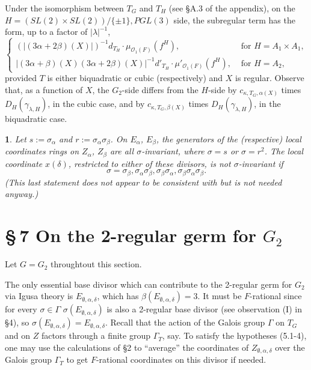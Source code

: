 \documentclass[12pt,letterpaper]{amsart}
\newcommand{\proclaimname}{}
\newtheorem*{proclaimx}{\proclaimname}
\newenvironment{proclaim}[1]%
  {\renewcommand{\proclaimname}{#1}\begin{proclaimx}}{\end{proclaimx}}
\begin{document}
Under the isomorphism between $T_G$ and $T_H$ (see \S A.3 of the appendix),
on the $H=(SL(2)\times SL(2))/\{\pm 1\},PGL(3)$ side,
the subregular term has the form, up to a factor of $|\lambda|^{-1}$,
\[
\begin{cases}
(|(3\alpha+2\beta)(X)|)^{-1}d_{T_H}\cdot
\mu_{{\mathcal O}_1(F)}(f^H),&\text{ for }
H=A_1\times A_1,\\
|(3\alpha+\beta)(X)(3\alpha+2\beta)(X)|^{-1}d'_{T_H}
\cdot \mu'_{{\mathcal O}_1(F)}(f^H),&\text{ for }H=A_2,
\end{cases}
\tag{6.8}
\]
provided $T$ is either biquadratic or cubic (respectively) and
$X$ is regular.
Observe that, as a function of $X$, the $G_2$-side differs
from the $H$-side by $c_{\kappa, T_G,\alpha(X)}$ times
$D_H(\gamma_{\lambda,H})$,
in the cubic case, and by $c_{\kappa, T_G,\beta(X)}$
times $D_H(\gamma_{\lambda,H})$,
in the biquadratic case.

\begin{proclaim}{Lemma 9.1} Let $s:=\sigma_\alpha$ and
$r:=\sigma_\alpha\sigma_\beta$.
On $E_\alpha$, $E_{\beta}$, the generators
of the (respective) local coordinates rings on
$Z_\alpha$, $Z_\beta$ are all $\sigma$-invariant, where
$\sigma=s$ or $\sigma=r^2$.
The local coordinate $x(\delta)$, restricted to either of these
divisors, is not $\sigma$-invariant if
\[
\sigma=\sigma_\beta, \sigma_\alpha\sigma_\beta,
\sigma_\beta\sigma_\alpha, \sigma_\beta\sigma_\alpha\sigma_\beta .
\]
(This last statement does not appear to be consistent
with \cite[Lemma 1.1, \S 1]{Ha92a} but is not needed anyway.)
\end{proclaim}
\fi
\section*{\S\,7 On the 2-regular germ for $G_2$}

Let $G=G_2$ throughtout this section.

The only essential base divisor which can contribute to the 2-regular
germ for $G_2$ via Igusa theory is $E_{\emptyset,\alpha,\delta}
$,
which has $\beta(E_{\emptyset,\alpha,\delta})=3$.
It must be $F$-rational since for every $\sigma\in\Gamma$
$\sigma(E_{\emptyset,\alpha,\delta})$
is also a 2-regular base divisor (see observation (I) in \S 4),
so $\sigma(E_{\emptyset,\alpha,\delta})=E_{\emptyset,\alpha,\delta}$.
Recall that the action of the Galois
group $\Gamma$ on $T_G$ and on $Z$ factors through a finite group
$\Gamma_T$, say.
To satisfy the hypotheses (5.1-4), one may use
the calculations of \S 2 to ``average'' the coordinates of
$Z_{\emptyset,\alpha,\delta}$
over the Galois group $\Gamma_T$
to get $F$-rational coordinates on this divisor if needed.
\end{document}
